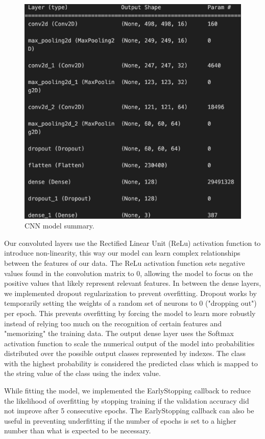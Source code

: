 \begin{figure}[h]
	\centering
	\includegraphics[scale=0.5]{CNN_structure}
	\caption{CNN model summary.}
	\label{fig:figure1}
\end{figure}

Our convoluted layers use the Rectified Linear Unit (ReLu) activation function to introduce non-linearity, this way our model can learn complex relationships between the features of our data. The ReLu activation function sets negative values found in the convolution matrix to 0, allowing the model to focus on the positive values that likely represent relevant features. In between the dense layers, we implemented dropout regularization to prevent overfitting. Dropout works by temporarily setting the weights of a random set of neurons to 0 ("dropping out") per epoch. This prevents overfitting by forcing the model to learn more robustly instead of relying too much on the recognition of certain features and "memorizing" the training data. The output dense layer uses the Softmax activation function to scale the numerical output of the model into probabilities distributed over the possible output classes represented by indexes. The class with the highest probability is considered the predicted class which is mapped to the string value of the class using the index value.

While fitting the model, we implemented the EarlyStopping callback to reduce the likelihood of overfitting by stopping training if the validation accuracy did not improve after 5 consecutive epochs. The EarlyStopping callback can also be useful in preventing underfitting if the number of epochs is set to a higher number than what is expected to be necessary. 

